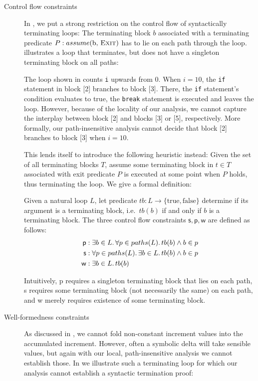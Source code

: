 \begin{description}
    \item[Control flow constraints] In , we put a strong restriction on the control flow of syntactically terminating loops: The terminating block $b$ associated with a terminating predicate $P: assume(\mathlist{b, \exit})$ has to lie on each path through the loop.  illustrates a loop that terminates, but does not have a singleton terminating block on all paths:
        \begin{example}
            The loop shown in  counts \texttt{i} upwards from 0. When $i = 10$, the \texttt{if} statement in block [2] branches to block [3]. There, the \texttt{if} statement's condition evaluates to true, the \texttt{break} statement is executed and leaves the loop. However, because of the locality of our analysis, we cannot capture the interplay between block [2] and blocks [3] or [5], respectively. More formally, our path-insensitive analysis cannot decide that block [2] branches to block [3] when $i = 10$.
        \end{example}
        This lends itself to introduce the following heuristic instead: Given the set of all terminating blocks $T$, assume some terminating block in $t \in T$ associated with exit predicate $P$ is executed at some point when $P$ holds, thus terminating the loop. We give a formal definition:
    \begin{definition}
        Given a natural loop $L$, let predicate $tb: L \rightarrow \{\text{true}, \text{false}\}$ determine if its argument is a terminating block, i.e.\ $tb(b)$ if and only if $b$ is a terminating block. The three control flow constraints $\textsf{s}, \textsf{p}, \textsf{w}$ are defined as follows:
    \begin{align*}
        \textsf{p}&: \exists b \in L \ldotp \forall p \in paths(L) \ldotp tb(b) \land b \in p \\
        \textsf{s}&: \forall p \in paths(L) \ldotp \exists b \in L \ldotp tb(b) \land b \in p \\
        \textsf{w}&: \exists b \in L \ldotp tb(b)
    \end{align*}
    \end{definition}
    Intuitively, \textsf{p} requires a singleton terminating block that lies on each path, \textsf{s} requires some terminating block (not necessarily the same) on each path, and \textsf{w} merely requires existence of some terminating block.
    \item[Well-formedness constraints] As discussed in , we cannot fold non-constant increment values into the accumulated increment. However, often a symbolic delta will take sensible values, but again with our local, path-insensitive analysis we cannot establish those. In  we illustrate such a terminating loop for which our analysis cannot establish a syntactic termination proof:


\end{description}
